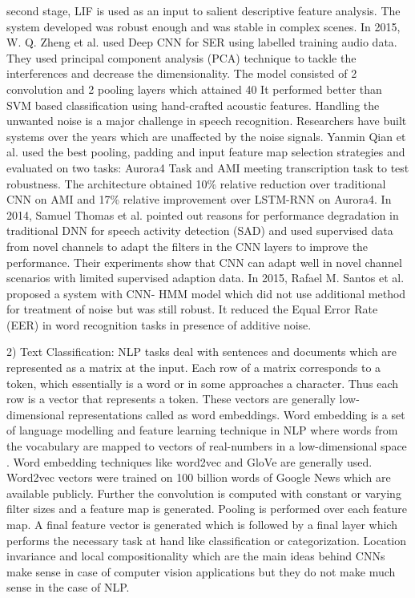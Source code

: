 \documentclass[12pt]{article}
\begin{document}
second stage, LIF is used as an input to salient descriptive
feature analysis. The system developed was robust enough
and was stable in complex scenes. In 2015, W. Q. Zheng et
al.  used Deep CNN for SER using labelled training
audio data. They used principal component analysis (PCA)
technique to tackle the interferences and decrease the
dimensionality. The model consisted of 2 convolution and 2
pooling layers which attained 40%
It performed better than SVM based classification using
hand-crafted acoustic features.
Handling the unwanted noise is a major challenge in
speech recognition. Researchers have built systems over the
years which are unaffected by the noise signals. Yanmin
Qian et al. used the best pooling, padding and input
feature map selection strategies and evaluated on two tasks:
Aurora4 Task and AMI meeting transcription task to test
robustness. The architecture obtained 10\% relative
reduction over traditional CNN on AMI and 17\% relative
improvement over LSTM-RNN on Aurora4. In 2014,
Samuel Thomas et al. pointed out reasons for
performance degradation in traditional DNN for speech
activity detection (SAD) and used supervised data from
novel channels to adapt the filters in the CNN layers to
improve the performance. Their experiments show that
CNN can adapt well in novel channel scenarios with limited
supervised adaption data. In 2015, Rafael M. Santos et al.
 proposed a system with CNN- HMM model which
did not use additional method for treatment of noise but was
still robust. It reduced the Equal Error Rate (EER) in word
recognition tasks in presence of additive noise.

2) Text Classification: NLP tasks deal with sentences
and documents which are represented as a matrix at the
input. Each row of a matrix corresponds to a token, which
essentially is a word or in some approaches a character.
Thus each row is a vector that represents a token. These
vectors are generally low-dimensional representations
called as word embeddings. Word embedding is a set of
language modelling and feature learning technique in NLP
where words from the vocabulary are mapped to vectors of
real-numbers in a low-dimensional space . Word
embedding techniques like word2vec and GloVe
are generally used. Word2vec vectors were trained on 100
billion words of Google News which are available publicly.
Further the convolution is computed with constant or
varying filter sizes and a feature map is generated. Pooling
is performed over each feature map. A final feature vector
is generated which is followed by a final layer which
performs the necessary task at hand like classification or
categorization.
Location
invariance
and
local
compositionality which are the main ideas behind CNNs
make sense in case of computer vision applications but they
do not make much sense in the case of NLP.
\end{document}
